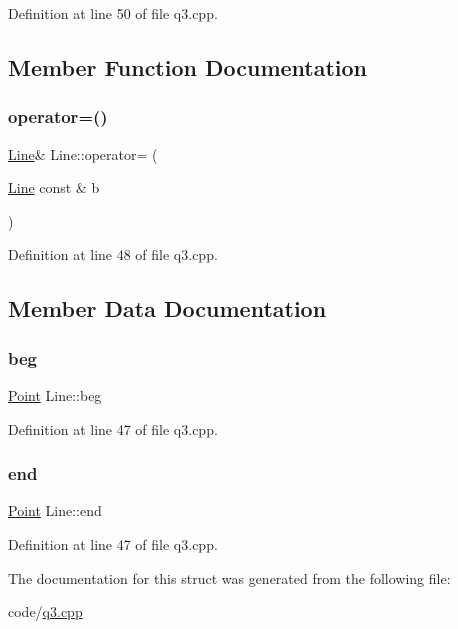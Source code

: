 Definition at line 50 of file q3.\+cpp.



\subsection{Member Function Documentation}
\mbox{\label{struct_line_a70001f8a33928acfc16bd9d362d57aad}} 
\subsubsection{\texorpdfstring{operator=()}{operator=()}}
{\footnotesize\ttfamily \hyperlink{struct_line}{Line}\& Line\+::operator= (\begin{DoxyParamCaption}\item[{\hyperlink{struct_line}{Line} const \&}]{b }\end{DoxyParamCaption})\hspace{0.3cm}{\ttfamily [inline]}}



Definition at line 48 of file q3.\+cpp.



\subsection{Member Data Documentation}
\mbox{\label{struct_line_a1a2e587cf1378a7cb7eb66a80065f226}} 
\subsubsection{\texorpdfstring{beg}{beg}}
{\footnotesize\ttfamily \hyperlink{struct_point}{Point} Line\+::beg}



Definition at line 47 of file q3.\+cpp.

\mbox{\label{struct_line_afca8cb662b46ae1724b7c38c3eab2069}} 
\subsubsection{\texorpdfstring{end}{end}}
{\footnotesize\ttfamily \hyperlink{struct_point}{Point} Line\+::end}



Definition at line 47 of file q3.\+cpp.



The documentation for this struct was generated from the following file\+:\begin{DoxyCompactItemize}
\item 
code/\hyperlink{q3_8cpp}{q3.\+cpp}\end{DoxyCompactItemize}
